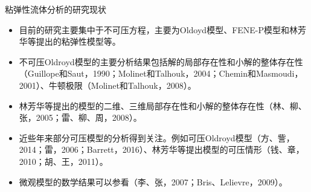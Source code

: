 \documentclass[mathserif]{beamer}
\begin{document}


 \begin{frame}{粘弹性流体分析的研究现状}
\begin{itemize}
\item<1-> 目前的研究主要集中于不可压方程，主要为Oldoyd模型、FENE-P模型和林芳华等提出的粘弹性模型等。
\item<2-> 不可压Oldroyd模型的主要分析结果包括解的局部存在性和小解的整体存在性（Guillope和Saut，1990；Molinet和Talhouk，2004；Chemin和Masmoudi，2001）、牛顿极限（Molinet和Talhouk，2008）。
\item<3-> 林芳华等提出的模型的二维、三维局部存在性和小解的整体存在性（林、柳、张，2005；雷、柳、周，2008）。
\item<4-> 近些年来部分可压模型的分析得到关注。例如可压Oldroyd模型（方、訾，2014；雷，2006；Barrett，2016）、林芳华等提出模型的可压情形（钱、章，2010；胡、王，2011）。
\item<5-> 微观模型的数学结果可以参看（李、张，2007；Bris、Lelievre，2009）。
\end{itemize}
 \end{frame}

\end{document}
